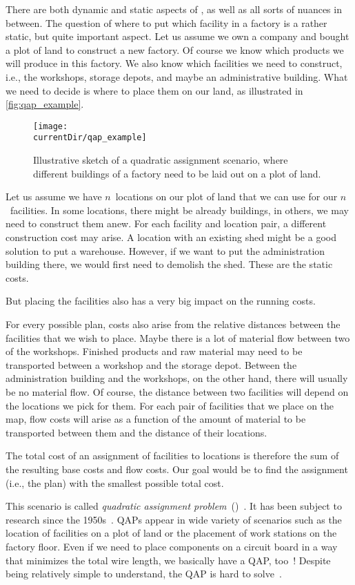 %
%
There are both dynamic and static aspects of , as well as all sorts of nuances in between.
The question of where to put which facility in a factory is a rather static, but quite important aspect.
Let us assume we own a company and bought a plot of land to construct a new factory.
Of course we know which products we will produce in this factory.
We also know which facilities we need to construct, i.e., the workshops, storage depots, and maybe an administrative building.
What we need to decide is where to place them on our land, as illustrated in \autoref{fig:qap_example}.%
%
\begin{figure}%
\centering%
\texttt{[image: \\currentDir/qap\_example]}%
\caption{Illustrative sketch of a quadratic assignment scenario, where different buildings of a factory need to be laid out on a plot of land.}%
\label{fig:qap_example}%
\end{figure}%

Let us assume we have $n$~locations on our plot of land that we can use for our $n$~facilities.
In some locations, there might be already buildings, in others, we may need to construct them anew.
For each facility and location pair, a different construction cost may arise.
A location with an existing shed might be a good solution to put a warehouse.
However, if we want to put the administration building there, we would first need to demolish the shed.
These are the static costs.

But placing the facilities also has a very big impact on the running costs.

For every possible plan, costs also arise from the relative distances between the facilities that we wish to place.
Maybe there is a lot of material flow between two of the workshops.
Finished products and raw material may need to be transported between a workshop and the storage depot.
Between the administration building and the workshops, on the other hand, there will usually be no material flow.
Of course, the distance between two facilities will depend on the locations we pick for them.
For each pair of facilities that we place on the map, flow costs will arise as a function of the amount of material to be transported between them and the distance of their locations.

The total cost of an assignment of facilities to locations is therefore the sum of the resulting base costs and flow costs.
Our goal would be to find the assignment (i.e., the plan) with the smallest possible total cost.

This scenario is called \emph{quadratic assignment problem}~()~\cite{BCPP1998TQAP}.
It has been subject to research since the 1950s~\cite{BK1957APATLOEA}.
QAPs appear in wide variety of scenarios such as the location of facilities on a plot of land or the placement of work stations on the factory floor.
Even if we need to place components on a circuit board in a way that minimizes the total wire length, we basically have a QAP, too~\cite{S1961TBWPAPA}!
Despite being relatively simple to understand, the QAP is hard to solve~\cite{SGA1976PCAP}.
%
\endhsection%
%

